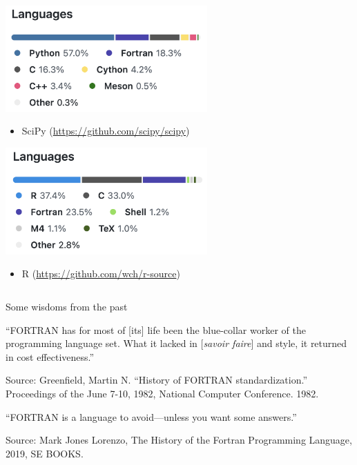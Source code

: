 \documentclass[aspectratio=169]{beamer}
\begin{document}
\begin{frame}
\begin{columns}[T]
\begin{column}{.6\textwidth}
    \includegraphics[width=0.58\textwidth]{scipy_screenshot.png}
\begin{itemize}
    \item \footnotesize SciPy (\url{https://github.com/scipy/scipy})
\end{itemize}
\vspace{0.1in}
    \includegraphics[width=0.58\textwidth]{r-source_screenshot.png}
\begin{itemize}
    \item \footnotesize R (\url{https://github.com/wch/r-source})
\end{itemize}
\end{column}%
\end{columns}

\end{frame}

\begin{frame}{Some wisdoms from the past}
\begin{block}{}
  {``FORTRAN has for most of [its] life been the blue-collar worker of the programming language set. What it lacked in [\textit{savoir faire}] and style, it returned in cost effectiveness.''}
  \vskip1mm
  \hspace*{}
\end{block}

{\scriptsize Source: Greenfield, Martin N. ``History of FORTRAN standardization.'' Proceedings of the June 7-10, 1982, National Computer Conference. 1982.}

\begin{block}{}
  {``FORTRAN is a language to avoid---unless you want some answers.''}
  \vskip1mm
  \hspace*{}
\end{block}

{\scriptsize Source: Mark Jones Lorenzo, The History of the Fortran Programming Language, 2019, SE BOOKS.}
\end{frame}
\end{document}
